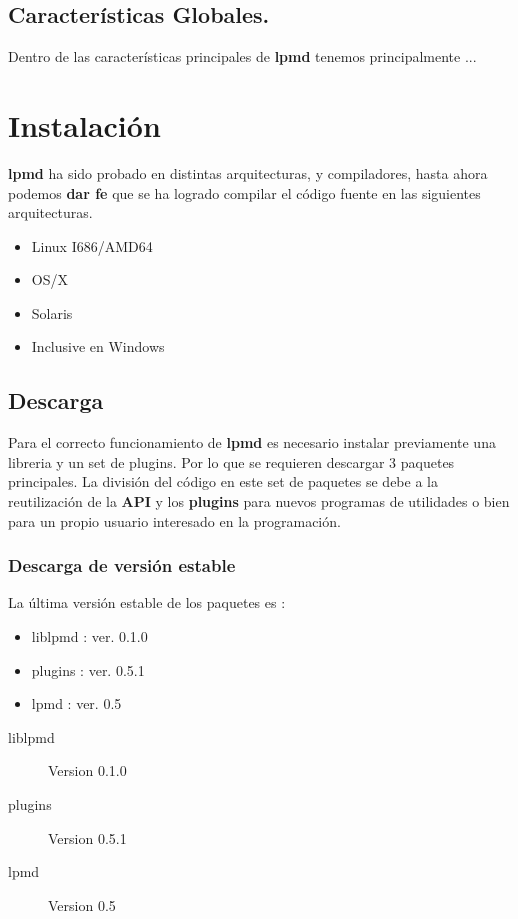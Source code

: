 \documentclass[a4paper,10pt]{scrbook}
\newcommand{\lpmd}{\textbf{lpmd }}
\begin{document}
\section{Caracter\'isticas Globales.}

Dentro de las caracter\'isticas principales de \lpmd tenemos principalmente ...

\chapter{Instalaci\'on}
\label{chap:inst}

\lpmd ha sido probado en distintas arquitecturas, y compiladores, hasta ahora podemos \textbf{dar fe} que se ha logrado compilar el c\'odigo fuente en las siguientes arquitecturas.

\begin{itemize}
 \item Linux I686/AMD64
 \item OS/X
 \item Solaris
 \item Inclusive en Windows
\end{itemize}

\section{Descarga}

Para el correcto funcionamiento de \lpmd es necesario instalar previamente una libreria y un set de plugins. Por lo que se requieren descargar 3 paquetes principales. La divisi\'on del c\'odigo en este set de paquetes se debe a la reutilizaci\'on de la \textbf{API} y los \textbf{plugins} para nuevos programas de utilidades o bien para un propio usuario interesado en la programaci\'on.

\subsection{Descarga de versi\'on estable}

La \'ultima versi\'on estable de los paquetes es :

\begin{itemize}
 \item liblpmd : ver. 0.1.0
 \item plugins : ver. 0.5.1
 \item lpmd    : ver. 0.5
\end{itemize}

\begin{description}
 \item [liblpmd] Version 0.1.0
 \item [plugins] Version 0.5.1
 \item [lpmd] Version 0.5
\end{description}
\end{document}
